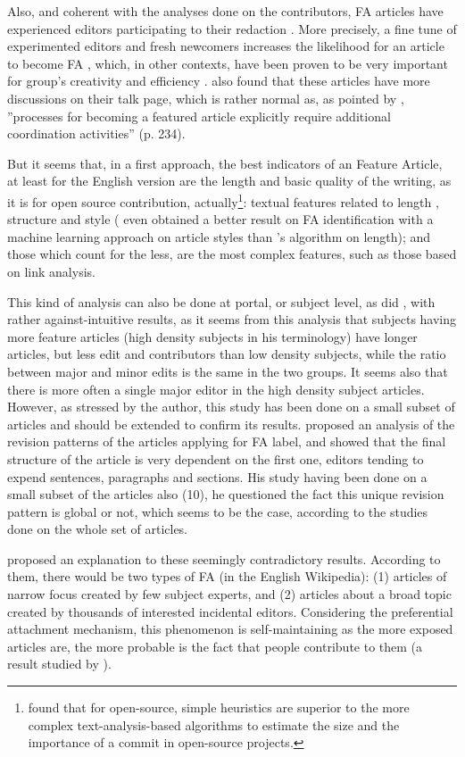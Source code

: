 Also, and coherent with the analyses done on the contributors, FA
articles have experienced editors participating to their redaction
\citep{SteinHess07}. More precisely, a fine tune of experimented
editors and fresh newcomers increases the likelihood for an article
to become FA \citep{RansbothamKane11}, which, in other contexts,
have been proven to be very important for group's creativity and efficiency
\citep[for instance, ][]{UzziSpiro05,Uzzi08}. \citet{WilkinsonHuberman07}
also found that these articles have more discussions on their talk
page, which is rather normal as, as pointed by \citet{ArazyNov10},
''processes for becoming a featured article explicitly require additional
coordination activities'' (p. 234).

But it seems that, in a first approach, the best indicators of an
Feature Article, at least for the English version \citep{Dalipetal09}
are the length and basic quality of the writing, as it is for open
source contribution, actually\footnote{\citet{HofmannRiehle09} found that for open-source, simple heuristics
are superior to the more complex text-analysis-based algorithms to
estimate the size and the importance of a commit in open-source projects.}: textual features related to length \citep[result already stressed by ][]{Blumenstock08},
structure and style (\citet{LipkaStein10} even obtained a better
result on FA identification with a machine learning approach on article
styles than \citeauthor{Blumenstock08}'s algorithm on length); and
those which count for the less, are the most complex features, such
as those based on link analysis.

This kind of analysis can also be done at portal, or subject level,
as did \citet{Poderi09}, with rather against-intuitive results, as
it seems from this analysis that subjects having more feature articles
(high density subjects in his terminology) have longer articles, but
less edit and contributors than low density subjects, while the ratio
between major and minor edits is the same in the two groups. It seems
also that there is more often a single major editor in the high density
subject articles. However, as stressed by the author, this study has
been done on a small subset of articles and should be extended to
confirm its results. \citet{Jones08} proposed an analysis of the
revision patterns of the articles applying for FA label, and showed
that the final structure of the article is very dependent on the first
one, editors tending to expend sentences, paragraphs and sections.
His study having been done on a small subset of the articles also
(10), he questioned the fact this unique revision pattern is global
or not, which seems to be the case, according to the studies done
on the whole set of articles.

\citet{Ibaetal10} proposed an explanation to these seemingly contradictory
results. According to them, there would be two types of FA (in the
English Wikipedia): (1) articles of narrow focus created by few subject
experts, and (2) articles about a broad topic created by thousands
of interested incidental editors. Considering the preferential attachment
mechanism, this phenomenon is self-maintaining as the more exposed
articles are, the more probable is the fact that people contribute
to them (a result studied by \citealp{RansbothamKaneLurie12}).
